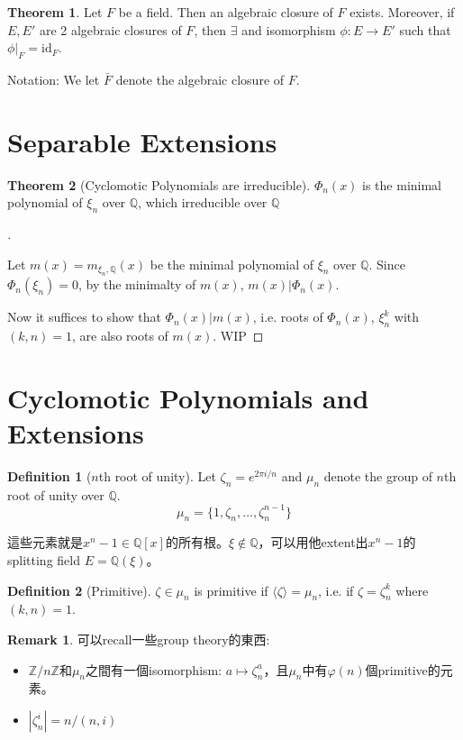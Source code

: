 \documentclass{article}
\theoremstyle{definition}
\newtheorem{thm}{Theorem}
\newtheorem{dfn}{Definition}
\newtheorem{rem}{Remark}
\newenvironment{proofs}[1][\proofname]{%
  \begin{proof}[#1]$ $\par\nobreak\ignorespaces
}{%
  \end{proof}
}
\newcommand{\QQ}{\mathbb Q}
\newcommand{\ZZ}{\mathbb Z}
\begin{document}
\begin{thm}
	Let $F$ be a field.
	Then an algebraic closure of $F$ exists.
	Moreover, if $E, E'$ are 2 algebraic closures of $F$, then $\exists$ and isomorphism $\phi: E \to E'$ such that $\phi|_F = \text{id}_F$.
\end{thm}

Notation: We let $\bar{F}$ denote the algebraic closure of $F$.

\section{Separable Extensions}

\begin{thm}[Cyclomotic Polynomials are irreducible]
	$\Phi_n(x)$ is the minimal polynomial of $\xi_n$ over $\QQ$, which irreducible over $\QQ$
\end{thm}

\begin{proofs}
	Let $m(x)=m_{\xi_n,\QQ}(x)$ be the minimal polynomial of $\xi_n$ over $\QQ$. Since $\Phi_n(\xi_n)=0$, by the minimalty of $m(x)$, $m(x)|\Phi_n(x)$. 

	Now it suffices to show that $\Phi_n(x)|m(x)$, i.e. roots of $\Phi_n(x)$, $\xi_n^k$ with $ (k,n)=1$, are also roots of $m(x)$.
	WIP
\end{proofs}

\section{Cyclomotic Polynomials and Extensions}

\begin{dfn}[$n$th root of unity]
	Let $\zeta_n=e^{2\pi i/n}$ and $\mu_n$ denote the group of $n$th root of unity over $\QQ$.
	\[\mu_n=\{1,\zeta_n,\dots,\zeta_n^{n-1}\}\]
\end{dfn}
這些元素就是$x^n-1\in\QQ[x]$的所有根。$\xi\notin\QQ$，可以用他extent出$x^n-1$的splitting field $E=\QQ(\xi)$。

\begin{dfn}[Primitive]
	$\zeta\in \mu_n$ is primitive if $\langle\zeta\rangle=\mu_n$, i.e. if $\zeta=\zeta_n^k$ where $(k,n)=1$.
\end{dfn}

\begin{rem}
	可以recall一些group theory的東西:
	\begin{itemize}
		\item $\ZZ/n\ZZ$和$\mu_n$之間有一個isomorphism: $a\mapsto \zeta_n^a$，且$\mu_n$中有$\varphi(n)$個primitive的元素。
		\item $|\zeta_n^i|=n/(n,i)$
	\end{itemize}
\end{rem}
\end{document}
